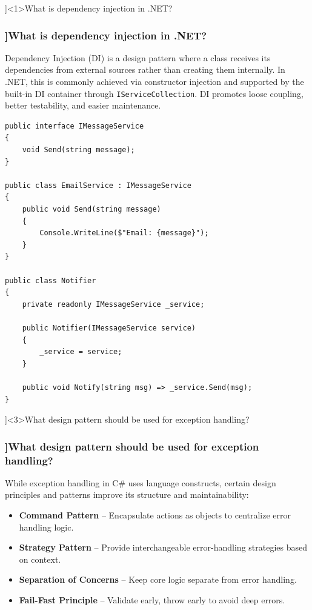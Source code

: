 \QuestionSlide[\CategoryBadge[OOPColor!20]{Design Patterns}]<1>{What is dependency injection in .NET?}

\begin{frame}[fragile]
  \frametitle{\AnswerTitle[\CategoryBadge[OOPColor!20]{Design Patterns}]{What is dependency injection in .NET?}}

  {\footnotesize
  Dependency Injection (DI) is a design pattern where a class receives its dependencies from external sources rather than creating them internally. In .NET, this is commonly achieved via constructor injection and supported by the built-in DI container through \texttt{IServiceCollection}. DI promotes loose coupling, better testability, and easier maintenance.
  }

  \begin{verbatim}
public interface IMessageService
{
    void Send(string message);
}

public class EmailService : IMessageService
{
    public void Send(string message)
    {
        Console.WriteLine($"Email: {message}");
    }
}

public class Notifier
{
    private readonly IMessageService _service;

    public Notifier(IMessageService service)
    {
        _service = service;
    }

    public void Notify(string msg) => _service.Send(msg);
}
  \end{verbatim}
\end{frame}

\QuestionSlide[\CategoryBadge[OOPColor!20]{Design Patterns}]<3>{What design pattern should be used for exception handling?}

\begin{frame}[fragile]
  \frametitle{\AnswerTitle[\CategoryBadge[OOPColor!20]{Design Patterns}]{What design pattern should be used for exception handling?}}

  {\footnotesize
  While exception handling in C\# uses language constructs, certain design principles and patterns improve its structure and maintainability:
  \begin{itemize}
    \item \textbf{Command Pattern} – Encapsulate actions as objects to centralize error handling logic.
    \item \textbf{Strategy Pattern} – Provide interchangeable error-handling strategies based on context.
    \item \textbf{Separation of Concerns} – Keep core logic separate from error handling.
    \item \textbf{Fail-Fast Principle} – Validate early, throw early to avoid deep errors.
  \end{itemize}
  }
\end{frame}

